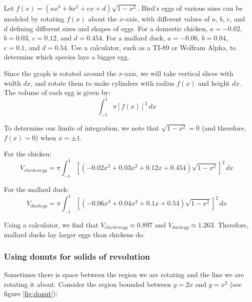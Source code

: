 \begin{Exercise}[label = volume5]
Let $f(x) = (ax^3 + bx^2 + cx + d)\sqrt{1-x^2}$. Bird's eggs of various sizes 
can be modeled by rotating $f(x)$ about the $x$-axis, with different values of 
$a$, $b$, $c$, and $d$ defining different sizes and shapes of eggs. For a 
domestic chicken, $a = -0.02$, $b = 0.03$, $c = 0.12$, and $d = 0.454$. For a 
mallard duck, $a = -0.06$, $b = 0.04$, $c = 0.1$, and $d = 0.54$. Use a 
calculator, such as a TI-89 or Wolfram Alpha, to determine which species lays 
a bigger egg.  
\end{Exercise}

\begin{Answer}[ref = volume5]
Since the graph is rotated around the $x$-axis, we will take vertical slices 
with width $dx$, and rotate them to make cylinders with radius $f(x)$ and height
$dx$. The volume of each egg is given by:
$$\int_{-1}^1 \pi \left[ f(x) \right]^2\,dx$$

To determine our limits of integration, we note that $\sqrt{1 - x^2} = 0$ (and 
therefore, $f(x) = 0$) when $x = \pm 1$.

For the chicken: 
$$V_{chicken egg} = \pi \int_{-1}^1 \left[ \left(-0.02x^3 + 0.03x^2 + 0.12x + 
0.454 \right) \sqrt{1 - x^2} \right]^2\,dx$$

For the mallard duck:
$$V_{duck egg} = \pi \int_{-1}^1 \left[ \left( -0.06x^3 + 0.04x^2 + 0.1x + 
0.54 \right) \sqrt{1 - x^2} \right]^2\,dx$$

Using a calculator, we find that $V_{chicken egg} \approx 0.897$ and 
$V_{duck egg} \approx 1.263$. Therefore, mallard ducks lay larger eggs than 
chickens do. 
\end{Answer}

\subsubsection{Using donuts for solids of revolution}
Sometimes there is space between the region we are rotating and the line we are
rotating it about. Consider the region bounded between $y = 2x$ and $y = x^2$  
(see figure \ref{fig:donut}):

